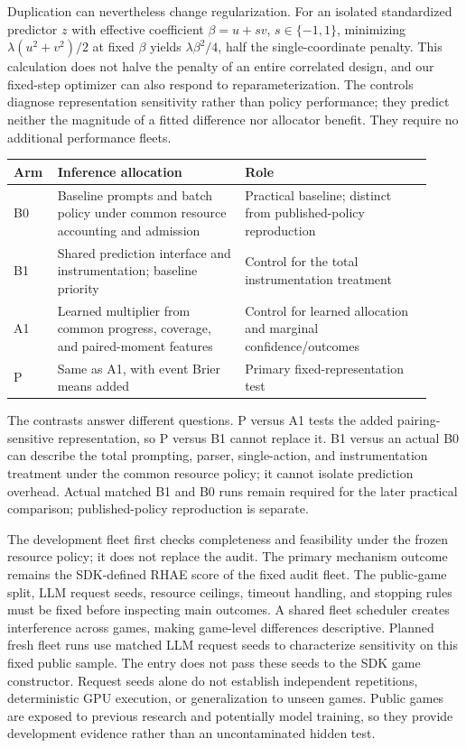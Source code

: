 \documentclass[11pt]{article}
\begin{document}
Duplication can nevertheless change regularization. For an isolated standardized predictor $z$ with effective coefficient $\beta=u+s v$, $s\in\{-1,1\}$, minimizing $\lambda(u^2+v^2)/2$ at fixed $\beta$ yields $\lambda\beta^2/4$, half the single-coordinate penalty. This calculation does not halve the penalty of an entire correlated design, and our fixed-step optimizer can also respond to reparameterization. The controls diagnose representation sensitivity rather than policy performance; they predict neither the magnitude of a fitted difference nor allocator benefit. They require no additional performance fleets.

\begin{center}
\small
\begin{tabular}{@{}p{0.08\linewidth}p{0.42\linewidth}p{0.42\linewidth}@{}}
\toprule
Arm & Inference allocation & Role \\
\midrule
B0 & Baseline prompts and batch policy under common resource accounting and admission & Practical baseline; distinct from published-policy reproduction \\
B1 & Shared prediction interface and instrumentation; baseline priority & Control for the total instrumentation treatment \\
A1 & Learned multiplier from common progress, coverage, and paired-moment features & Control for learned allocation and marginal confidence/outcomes \\
P & Same as A1, with event Brier means added & Primary fixed-representation test \\
\bottomrule
\end{tabular}
\end{center}

The contrasts answer different questions. P versus A1 tests the added pairing-sensitive representation, so P versus B1 cannot replace it. B1 versus an actual B0 can describe the total prompting, parser, single-action, and instrumentation treatment under the common resource policy; it cannot isolate prediction overhead. Actual matched B1 and B0 runs remain required for the later practical comparison; published-policy reproduction is separate.

The development fleet first checks completeness and feasibility under the frozen resource policy; it does not replace the audit. The primary mechanism outcome remains the SDK-defined RHAE score of the fixed audit fleet. The public-game split, LLM request seeds, resource ceilings, timeout handling, and stopping rules must be fixed before inspecting main outcomes. A shared fleet scheduler creates interference across games, making game-level differences descriptive. Planned fresh fleet runs use matched LLM request seeds to characterize sensitivity on this fixed public sample. The entry does not pass these seeds to the SDK game constructor. Request seeds alone do not establish independent repetitions, deterministic GPU execution, or generalization to unseen games. Public games are exposed to previous research and potentially model training, so they provide development evidence rather than an uncontaminated hidden test.
\end{document}
